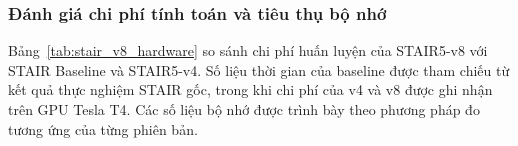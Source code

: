 
\subsubsection{Đánh giá chi phí tính toán và tiêu thụ bộ nhớ}

Bảng~\ref{tab:stair_v8_hardware} so sánh chi phí huấn luyện của STAIR5-v8 với STAIR Baseline và STAIR5-v4. Số liệu thời gian của baseline được tham chiếu từ kết quả thực nghiệm STAIR gốc, trong khi chi phí của v4 và v8 được ghi nhận trên GPU Tesla T4. Các số liệu bộ nhớ được trình bày theo phương pháp đo tương ứng của từng phiên bản.

\begingroup
\footnotesize
\renewcommand{\arraystretch}{1.12}
\setlength{\tabcolsep}{5pt}
\setlength{\LTleft}{\fill}
\setlength{\LTright}{\fill}

